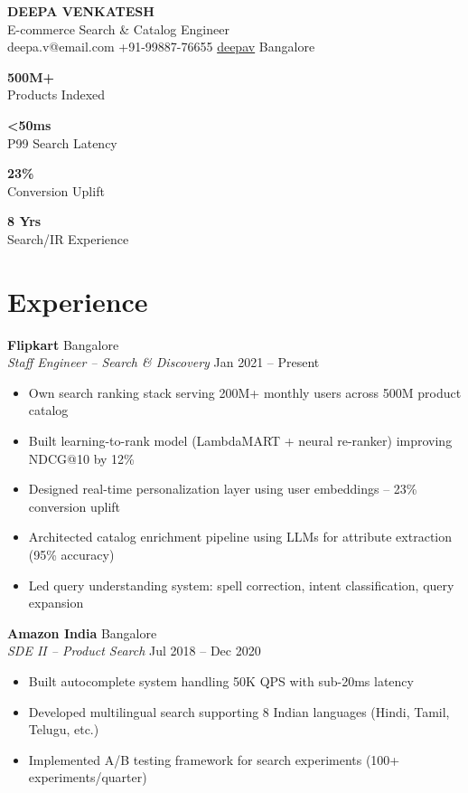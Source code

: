 \documentclass[10pt,letterpaper]{article}
\newcommand{\metric}[2]{\begin{tcolorbox}\centering\textbf{\large\color{ecorange}#1}\\{\scriptsize #2}\end{tcolorbox}}
\begin{document}
\begin{center}
{\LARGE\bfseries\color{ecorange} DEEPA VENKATESH}\\[4pt]
{\normalsize E-commerce Search \& Catalog Engineer}\\[4pt]
{\small {} deepa.v@email.com \quad {} +91-99887-76655 \quad {} \href{https://linkedin.com/in/deepav}{deepav} \quad {} Bangalore}
\end{center}

\vspace{6pt}
\noindent\begin{minipage}[t]{0.24\linewidth}\metric{500M+}{Products Indexed}\end{minipage}\hfill
\begin{minipage}[t]{0.24\linewidth}\metric{<50ms}{P99 Search Latency}\end{minipage}\hfill
\begin{minipage}[t]{0.24\linewidth}\metric{23\%}{Conversion Uplift}\end{minipage}\hfill
\begin{minipage}[t]{0.24\linewidth}\metric{8 Yrs}{Search/IR Experience}\end{minipage}

\section{Experience}

\textbf{Flipkart} \hfill Bangalore\\
\textit{Staff Engineer -- Search \& Discovery} \hfill Jan 2021 -- Present
\begin{itemize}
\item Own search ranking stack serving 200M+ monthly users across 500M product catalog
\item Built learning-to-rank model (LambdaMART + neural re-ranker) improving NDCG@10 by 12\%
\item Designed real-time personalization layer using user embeddings -- 23\% conversion uplift
\item Architected catalog enrichment pipeline using LLMs for attribute extraction (95\% accuracy)
\item Led query understanding system: spell correction, intent classification, query expansion
\end{itemize}

\textbf{Amazon India} \hfill Bangalore\\
\textit{SDE II -- Product Search} \hfill Jul 2018 -- Dec 2020
\begin{itemize}
\item Built autocomplete system handling 50K QPS with sub-20ms latency
\item Developed multilingual search supporting 8 Indian languages (Hindi, Tamil, Telugu, etc.)
\item Implemented A/B testing framework for search experiments (100+ experiments/quarter)
\end{itemize}
\end{document}
